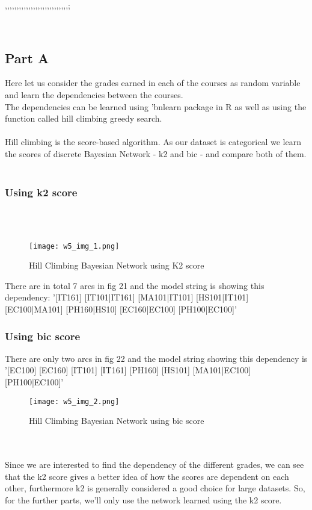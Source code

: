 ,,,,,,,,,,,,,,,,,,,,,,,,,,,;\documentclass[conference]{IEEEtran}
\begin{document}
\\
\subsection{Part A}
Here let us consider the grades earned in each of the courses as random variable and learn the dependencies between the courses.
\\
The dependencies can be learned using  'bnlearn package in R as well as using the function called hill climbing greedy search. 
\\
\\
Hill climbing is the score-based algorithm. As our dataset is categorical we learn the scores of discrete Bayesian Network - k2 and bic - and compare both of them.\cite{b3}
\\
\\

\subsubsection{Using k2 score}
\\
\\
\begin{figure}[htbp]
\centerline{\texttt{[image: w5\_img\_1.png]}}
\caption{Hill Climbing Bayesian Network using K2 score}
\label{fig}
\end{figure}

There are in total 7 arcs in fig 21 and the model string is showing this dependency: '[IT161] [IT101|IT161] [MA101|IT101] [HS101|IT101]
[EC100|MA101] [PH160|HS10] [EC160|EC100]
[PH100|EC100]’

\subsubsection{Using bic score}

There are only two arcs in fig 22 and the model string showing this dependency is '[EC100] [EC160] [IT101] [IT161] [PH160] [HS101]
[MA101|EC100] [PH100|EC100]'

\begin{figure}[htbp]
\centerline{\texttt{[image: w5\_img\_2.png]}}
\caption{Hill Climbing Bayesian Network using bic score}
\label{fig}
\end{figure}
\\
\\
Since we are interested to find the dependency of the
different grades, we can see that the k2 score gives a better idea
of how the scores are dependent on each other, furthermore k2 is generally considered a good choice for large datasets. So, for the further parts, we’ll only use the network learned
using the k2 score.\cite{b8}
\\
\\
\end{document}
